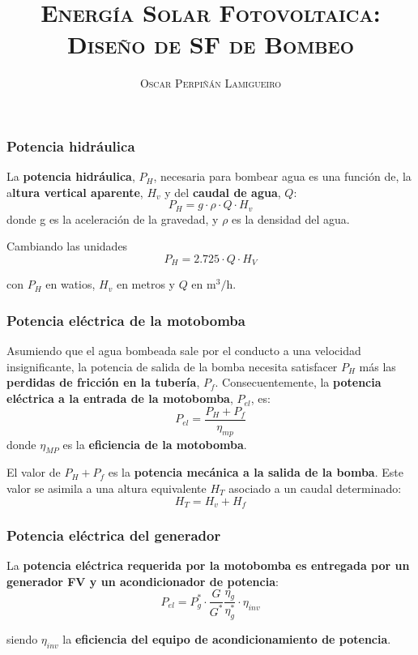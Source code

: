 \documentclass[serif, xcolor=dvipsnames]{beamer}
\begin{document}
\title[\textsc{ESF: Diseño SFB}]{\textsc{Energía Solar Fotovoltaica:}\\
\textsc{Diseño de SF de Bombeo}}


\author{\textsc{Oscar Perpiñán Lamigueiro}}
\date{}
\frame[plain]{\titlepage}



\begin{frame}
\frametitle{Potencia hidráulica}

La \textbf{potencia hidráulica}, $P_{H}$, necesaria para bombear
agua es una función de, la a\textbf{ltura vertical aparente}, $H_{v}$
y del \textbf{caudal de agua}, $Q$:\[
P_{H}=g\cdot\rho\cdot Q\cdot H_{v}\]
donde g es la aceleración de la gravedad, y $\rho$ es la densidad
del agua. 

Cambiando las unidades\[
P_{H}=2.725\cdot Q\cdot H_{V}\]


con $P_{H}$ en watios, $H_{v}$ en metros y $Q$ en $\si{\meter\cubed\per\hour}$.


\end{frame}
\begin{frame}
\frametitle{Potencia eléctrica de la motobomba}

Asumiendo que el agua bombeada sale por el conducto a una velocidad
insignificante, la potencia de salida de la bomba necesita satisfacer
$P_{H}$ más las \textbf{perdidas de fricción en la tubería}, $P_{f}$.
Consecuentemente, la \textbf{potencia eléctrica a la entrada de la
motobomba}, $P_{el}$, es:\[
P_{el}=\frac{P_{H}+P_{f}}{\eta_{mp}}\]
donde $\eta_{MP}$ es la \textbf{eficiencia de la motobomba}.

El valor de $P_{H}+P_{f}$ es la \textbf{potencia mecánica a la salida
de la bomba}. Este valor se asimila a una altura equivalente $H_{T}$
asociado a un caudal determinado:\[
H_{T}=H_{v}+H_{f}\]



\end{frame}
\begin{frame}
\frametitle{Potencia eléctrica del generador}

La \textbf{potencia eléctrica requerida por la motobomba es entregada
por un generador FV y un acondicionador de potencia}:\[
P_{el}=P_{g}^{*}\cdot\frac{G}{G^{*}}\frac{\eta_{g}}{\eta_{g}^{*}}\cdot\eta_{inv}\]


siendo $\eta_{inv}$ la \textbf{eficiencia del equipo de acondicionamiento
de potencia}.


\end{frame}
\end{document}

